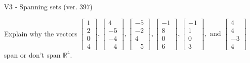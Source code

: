 \begin{exercise}
  \begin{exerciseTitle}V3 - Spanning sets (ver. 397)\end{exerciseTitle}
  \begin{exerciseStatement}
    Explain why the vectors \(\left[\begin{array}{r}
1 \\
2 \\
0 \\
4
\end{array}\right] , \left[\begin{array}{r}
4 \\
-5 \\
-4 \\
-4
\end{array}\right] , \left[\begin{array}{r}
-5 \\
-2 \\
4 \\
-5
\end{array}\right] , \left[\begin{array}{r}
-1 \\
8 \\
0 \\
6
\end{array}\right] , \left[\begin{array}{r}
-1 \\
1 \\
0 \\
3
\end{array}\right] , \text{ and } \left[\begin{array}{r}
4 \\
4 \\
-3 \\
4
\end{array}\right]\) span or don't span \(\mathbb{R}^4\). 
	



\end{exerciseStatement}
\end{exercise}

